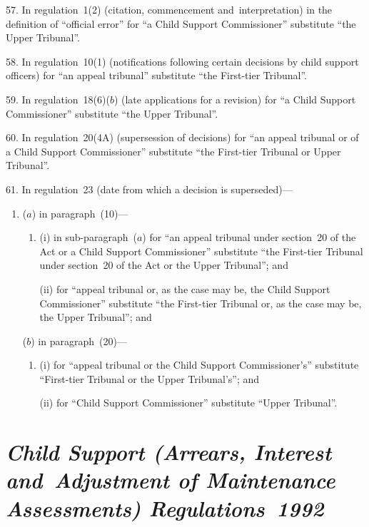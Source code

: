 \documentclass[12pt,a4paper]{article}
\begin{document}
\medskip

57.  In regulation~1(2) (citation, commencement and~interpretation) in the definition of “official error” for “a Child Support Commissioner” substitute “the Upper Tribunal”.

\medskip

58.  In regulation~10(1) (notifications following certain decisions by child support officers) for “an appeal tribunal” substitute “the First-tier Tribunal”.

\medskip

59.  In regulation~18(6)($b$)  (late applications for a revision) for “a Child Support Commissioner” substitute “the Upper Tribunal”.

\medskip

60.  In regulation~20(4A) (supersession of decisions) for “an appeal tribunal or of a Child Support Commissioner” substitute “the First-tier Tribunal or Upper Tribunal”.

\medskip

61.  In regulation~23 (date from which a decision is superseded)—
\begin{enumerate}\item[]
($a$) in paragraph~(10)—
\begin{enumerate}\item[]
(i) in sub-paragraph~($a$)  for “an appeal tribunal under section~20 of the Act or a Child Support Commissioner” substitute “the First-tier Tribunal under section~20 of the Act or the Upper Tribunal”; and

(ii) for “appeal tribunal or, as the case may be, the Child Support Commissioner” substitute “the First-tier Tribunal or, as the case may be, the Upper Tribunal”; and
\end{enumerate}

($b$) in paragraph~(20)—
\begin{enumerate}\item[]
(i) for “appeal tribunal or the Child Support Commissioner’s” substitute “First-tier Tribunal or the Upper Tribunal’s”; and

(ii) for “Child Support Commissioner” substitute “Upper Tribunal”.
\end{enumerate}
\end{enumerate}

\section*{\itshape Child Support (Arrears, Interest and~Adjustment of Maintenance Assessments) Regulations~1992}
\end{document}
